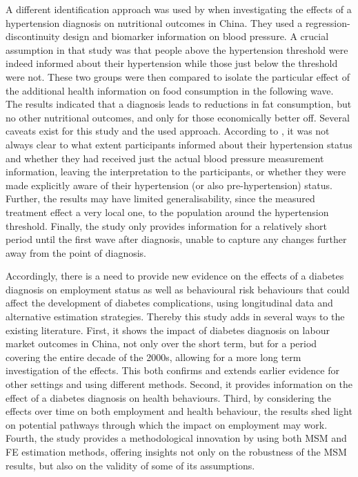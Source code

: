 A different identification approach was used by \textcite{Zhao2013a} when investigating the effects of a hypertension diagnosis on nutritional outcomes in China. They used a regression-discontinuity design and biomarker information on blood pressure. A crucial assumption in that study was that people above the hypertension threshold were indeed informed about their hypertension while those just below the threshold were not. These two groups were then compared to isolate the particular effect of the additional health information on food consumption in the following wave. The results indicated that a diagnosis leads to reductions in fat consumption, but no other nutritional outcomes, and only for those economically better off. Several caveats exist for this study and the used approach. According to \textcite{Zhao2013a}, it was not always clear to what extent participants \DIFdelbegin {}\DIFdelend \DIFaddbegin {}\DIFaddend informed about their hypertension status and whether they had received just the actual blood pressure measurement information, leaving the interpretation to the participants, or whether they were made explicitly aware of their hypertension (or also pre-hypertension) status. Further, the results may have limited generalisability, since the measured treatment effect \DIFdelbegin {}\DIFdelend \DIFaddbegin {}\DIFaddend a very local one, \DIFdelbegin {}\DIFdelend \DIFaddbegin {}\DIFaddend to the population around the hypertension threshold. Finally, the study only provides information for a relatively short period until the first wave after diagnosis, unable to capture any changes further away from the point of diagnosis. 

Accordingly, there is a need to provide new evidence on the effects of a diabetes diagnosis on employment status as well as behavioural risk behaviours that could affect the development of diabetes complications, using longitudinal data and alternative estimation strategies. Thereby this study adds in several ways to the existing literature. First, it shows the impact of diabetes diagnosis on labour market outcomes in China, not only over the short term, but for a period covering the entire decade of the 2000s, allowing for a more long term investigation of the effects. This both confirms and extends earlier evidence for other settings and using different methods. Second, it provides information on the effect of a diabetes diagnosis on health behaviours. Third, by considering the effects over time on both employment and health behaviour, the results shed light on potential pathways through which the impact on employment may work.  Fourth, the study provides a methodological innovation by using both \ac{MSM} and \ac{FE} estimation methods, offering insights not only on the robustness of the \ac{MSM} results, but also on the validity of some of its assumptions.  


